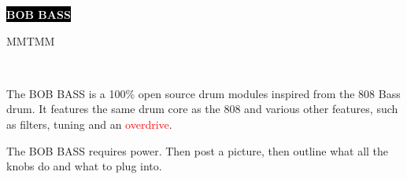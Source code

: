 \documentclass[9pt]{developercv} %
\begin{document}
\begin{minipage}[t]{0.45\textwidth} %
	\vspace{-\baselineskip} %
	
	\colorbox{black}{{\HUGE\textcolor{white}{\textbf{\MakeUppercase{BOB BASS}}}}} %
	
	\vspace{6pt}
	
	{\huge MMTMM} %
\end{minipage}
\begin{minipage}[t]{0.275\textwidth} %
	\vspace{-\baselineskip} %
	\\
\end{minipage}

\vspace{0.5cm}


\begin{minipage}[t]{0.4\textwidth} %
	\vspace{-\baselineskip} %
	
The BOB BASS is a 100\% open source drum modules inspired from the 808 Bass drum. It features the same drum core as the 808 and various other features, such as filters, tuning and an \textcolor{red}{overdrive}.

\end{minipage}

\hfill %


The BOB BASS requires power. Then post a picture, then outline what all the knobs do and what to plug into.
\end{document}
